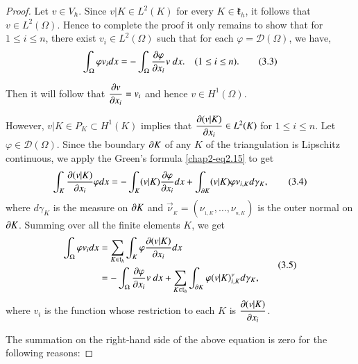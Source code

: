 \begin{proof}
Let $v\in V_{h}$. Since $v|K\in L^{2}(K)$ for every
$K\in\mathfrak{k}_{h}$, it follows that $v\in L^{2}(\Omega)$. Hence to
complete the proof it only remains to show that for $1\leq i\leq n$,
there exist $v_{i}\in L^{2}(\Omega)$ such that for each
$\varphi=\mathscr{D}(\Omega)$, we have,
\begin{equation*}
\int_{\Omega}\varphi v_{i}dx=-\int_{\Omega}\frac{\partial \varphi}{\partial
  x_{i}}v\ dx.\quad (1\leq i\leq n).\tag{3.3}\label{chap3-eq3.3}
\end{equation*}

Then it will follow that $\dfrac{\partial v}{\partial x_{i}}=v_{i}$ and hence
$v\in H^{1}(\Omega)$.

However, $v|K\in P_{K}\subset H^{1}(K)$ implies that $\dfrac{\partial
  (v|K)}{\partial x_{i}}\in L^{2}(K)$ for $1\leq i\leq n$. Let
$\varphi\in\mathscr{D}(\Omega)$. Since the boundary $\partial K$ of any $K$
of the triangulation is Lipschitz continuous, we apply the Green's
formula \eqref{chap2-eq2.15} to get
\begin{equation*}
\int_{K}\frac{\partial (v|K)}{\partial x_{i}}\varphi dx=-\int_{K}(v|K)\frac{\partial
  \varphi}{\partial x_{i}}dx+\int_{\partial
  K}(v|K)\varphi\nu_{i,K}d\gamma_{K},\tag{3.4}\label{chap3-eq3.4} 
\end{equation*}
where $d\gamma_{K}$ is the measure on $\partial K$ and
$\overrightarrow{\nu}_{_{K}} = (\nu_{_{1,K}},\ldots,\nu_{_{n,K}})$ is the
outer normal on $\partial K$. Summing over all the finite elements $K$, we
get
\begin{equation*}
\begin{split}
\int_{\Omega}\varphi v_{i}dx &=
\sum_{K\in\mathfrak{k}_{h}}\int_{K}\varphi \frac{\partial (v|K)}{\partial
  x_{i}}dx\\
&= -\int_{\Omega}\frac{\partial \varphi}{\partial
  x_{i}}v\ dx+\sum_{K\in\mathfrak{k}_{h}}\int_{\partial
  K}\varphi(v|K)^{\nu}_{i,K}d\gamma_{K}, 
\end{split}\tag{3.5}\label{chap3-eq3.5}
\end{equation*}
where $v_{i}$ is the function whose restriction to each $K$ is
$\dfrac{\partial(v|K)}{\partial x_{i}}$. 

The summation on the right-hand side of the above equation is zero for
the following reasons:


\end{proof}
